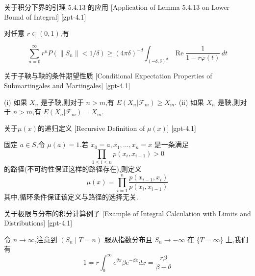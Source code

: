 \documentclass[UTF8]{ctexart}
\begin{document}
    
    
    \begin{lma}
        {关于积分下界的引理 5.4.13 的应用}
        [Application of Lemma 5.4.13 on Lower Bound of Integral]
        [gpt-4.1]
        
对任意 $r \in (0,1)$,有

\[
\sum_{n=0}^{\infty} r^n P(\|S_n\| < 1/\delta) \ge (4\pi\delta)^{-d} \int_{(-\delta, \delta)^d} \operatorname{Re} \frac{1}{1 - r \varphi(t)} \, dt
\]

    \end{lma}
    
    
    
    \begin{thm}
        {关于子鞅与鞅的条件期望性质}
        [Conditional Expectation Properties of Submartingales and Martingales]
        [gpt-4.1]
        
(i) 如果 $X_n$ 是子鞅,则对于 $n > m$,有 $E ( X_n | \mathcal{F}_m ) \geq X_m$.
(ii) 如果 $X_n$ 是鞅,则对于 $n > m$,有 $E ( X_n | \mathcal{F}_m ) = X_m$.

    \end{thm}
    
    
    
    \begin{dfn}
        {关于$\mu(x)$的递归定义}
        [Recursive Definition of $\mu(x)$]
        [gpt-4.1]
        
固定 $a \in S$,令 $\mu(a) = 1$.若 $x_{0} = a, x_{1}, \ldots, x_{n} = x$ 是一条满足
\[
\prod_{1 \leq i \leq n} p(x_{i}, x_{i-1}) > 0
\]
的路径(不可约性保证这样的路径存在),则定义
\[
\mu(x) = \prod_{i=1}^{n} \frac{p(x_{i-1}, x_{i})}{p(x_{i}, x_{i-1})}
\]
其中,循环条件保证该定义与路径的选择无关.

    \end{dfn}
    
    
    
    \begin{xmp}
        {关于极限与分布的积分计算例子}
        [Example of Integral Calculation with Limits and Distributions]
        [gpt-4.1]
        
令 $n \to \infty$,注意到 $(S_{n} \mid T = n)$ 服从指数分布且 $S_{n} \to -\infty$ 在 $\{T = \infty\}$ 上,我们有
\[
1 = r \int_{0}^{\infty} e^{\theta x} \beta e^{-\beta x} dx = \frac{r \beta}{\beta - \theta}
\]

    \end{xmp}
    
\end{document}
